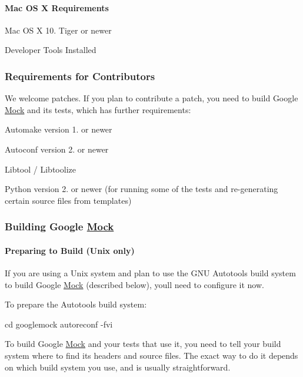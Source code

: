 \paragraph*{Mac OS X Requirements}


\begin{DoxyItemize}
\item Mac OS X 10. Tiger or newer
\item Developer Tools Installed
\end{DoxyItemize}

\subsubsection*{Requirements for Contributors}

We welcome patches. If you plan to contribute a patch, you need to build Google \hyperlink{class_mock}{Mock} and its tests, which has further requirements\+:


\begin{DoxyItemize}
\item Automake version 1. or newer
\item Autoconf version 2. or newer
\item Libtool / Libtoolize
\item Python version 2. or newer (for running some of the tests and re-\/generating certain source files from templates)
\end{DoxyItemize}

\subsubsection*{Building Google \hyperlink{class_mock}{Mock}}

\paragraph*{Preparing to Build (Unix only)}

If you are using a Unix system and plan to use the G\+NU Autotools build system to build Google \hyperlink{class_mock}{Mock} (described below), you\textquotesingle{}ll need to configure it now.

To prepare the Autotools build system\+: \begin{DoxyVerb}cd googlemock
autoreconf -fvi
\end{DoxyVerb}


To build Google \hyperlink{class_mock}{Mock} and your tests that use it, you need to tell your build system where to find its headers and source files. The exact way to do it depends on which build system you use, and is usually straightforward.

